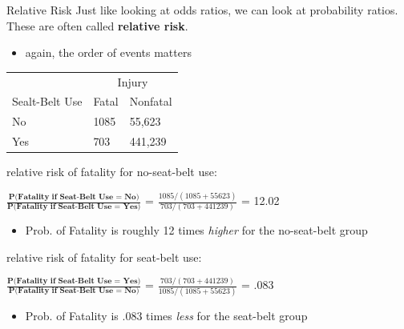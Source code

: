 \documentclass{beamer}
\begin{document}
\begin{frame}{Relative Risk}
Just like looking at odds ratios, we can look at probability ratios. These are often called \textbf{relative risk}.
\begin{itemize}
    \item again, the order of events matters
\end{itemize}

\begin{center}
\begin{tabular}{|p{3cm}|p{3cm}|p{3cm}|}
\hline
 & \multicolumn{2}{c|}{Injury}      \\ \cline{2-3}
  Sealt-Belt Use   & Fatal & Nonfatal      \\ \hline
  No  & 1085  & 55,623   \\ \hline
  Yes & 703   & 441,239  \\ \hline
\end{tabular}
\end{center} \vspace{3mm}

relative risk of fatality for no-seat-belt use: \vspace{2mm}

$\frac{\textbf{P(Fatality if Seat-Belt Use = No)}}{\textbf{P(Fatality if Seat-Belt Use = Yes)}}$ =  $\frac{1085 / (1085 + 55623)}{703 / (703 + 441239)}$ = 12.02
\begin{itemize}
    \item Prob. of Fatality is roughly 12 times \textit{higher } for the no-seat-belt group
\end{itemize} \vspace{2mm}

relative risk of fatality for seat-belt use: \vspace{2mm}

$\frac{\textbf{P(Fatality if Seat-Belt Use = Yes)}}{\textbf{P(Fatality if Seat-Belt Use = No)}}$ =  $\frac{703 / (703 + 441239)}{1085 / (1085 + 55623)}$ = .083
\begin{itemize}
    \item Prob. of Fatality is .083 times \textit{less} for the seat-belt group
\end{itemize}
\end{frame}

%



%
%
\end{document}

